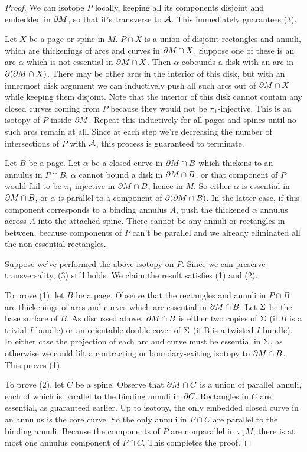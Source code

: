 \begin{proof}

We can isotope $P$ locally, keeping all its components disjoint and embedded in
$\partial M$, so that it's transverse to $\mathcal{A}$. This immediately guarantees (3).

Let $X$ be a page or spine in $M$. $P \cap X$ is a union of disjoint rectangles
and annuli, which are thickenings of arcs and curves in $\partial M \cap X$. Suppose
one of these is an arc $\alpha$ which is not essential in $\partial M \cap X$. Then
$\alpha$ cobounds a disk with an arc in $\partial (\partial M \cap X)$. There may be
other arcs in the interior of this disk, but with an innermost disk argument we
can inductively push all such arcs out of $\partial M \cap X$ while keeping them
disjoint.  Note that the interior of this disk cannot contain any closed curves
coming from $P$ because they would not be $\pi_1$-injective. This is an isotopy
of $P$ inside $\partial M$.  Repeat this inductively for all pages and spines until
no such arcs remain at all.  Since at each step we're decreasing the number of
intersections of $P$ with $\mathcal{A}$, this process is guaranteed to terminate.

Let $B$ be a page. Let $\alpha$ be a closed curve in $\partial M \cap B$ which
thickens to an annulus in $P \cap B$. $\alpha$ cannot bound a disk in $\partial
M \cap B$, or that component of $P$ would fail to be $\pi_1$-injective in $\partial
M \cap B$, hence in $M$. So either $\alpha$ is essential in $\partial M \cap B$, or
$\alpha$ is parallel to a component of $\partial(\partial M \cap B)$. In the latter case,
if this component corresponds to a binding annulus $A$, push the thickened
$\alpha$ annulus across $A$ into the attached spine.  There cannot be any
annuli or rectangles in between, because components of $P$ can't be parallel
and we already eliminated all the non-essential rectangles.

Suppose we've performed the above isotopy on $P$. Since we can preserve
transversality, (3) still holds. We claim the result satisfies (1) and (2).

To prove (1), let $B$ be a page. Observe that the rectangles and annuli in $P
\cap B$ are thickenings of arcs and curves which are essential  in $\partial M \cap
B$. Let $\Sigma$ be the base surface of $B$. As discussed above, $\partial M \cap B$ is
either two copies of $\Sigma$ (if $B$ is a trivial $I$-bundle) or an orientable
double cover of $\Sigma$ (if B is a twisted $I$-bundle). In either case the
projection of each arc and curve must be essential in $\Sigma$, as otherwise we
could lift a contracting or boundary-exiting isotopy to $\partial M \cap B$. This
proves (1).

To prove (2), let $C$ be a spine. Observe that $\partial M \cap C$ is a union of
parallel annuli, each of which is parallel to the binding annuli in $\partial C$.
Rectangles in $C$ are essential, as guaranteed earlier. Up to isotopy, the only
embedded closed curve in an annulus is the core curve. So the only annuli in $P
\cap C$ are parallel to the binding annuli. Because the components of $P$ are
nonparallel in $\pi_1M$, there is at most one annulus component of $P\cap C$.
This completes the proof.

\end{proof}

